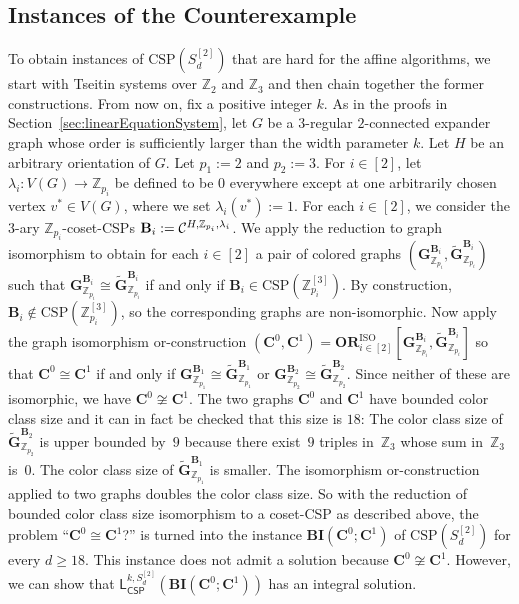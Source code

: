 \documentclass[a4paper,english, thm-restate]{lipics-v2021}
\newcommand{\ZZ}{\mathbb{Z}}
\newcommand{\CFIsym}{\mathbf{G}}
\newcommand{\CFIA}[2]{\CFIsym_{#1}^{#2}}
\newcommand{\CFIB}[2]{\widetilde{\CFIsym}_{#1}^{#2}}
\newcommand{\StructB}{\mathbf{B}}
\newcommand{\StructC}{\mathbf{C}}
\newcommand{\CSP}[1]{\mathrm{CSP}(#1)}
\newcommand{\leqs}{\mathsf{L}}
\newcommand{\cspiso}[3]{\leqs^{#1,#2}_{\mathsf{CSP}}(#3)}
\newcommand{\bbZ}{\mathbb{Z}}
\newcommand{\bcisosys}[2]{\mathbf{BI}(#1;#2)}
\newcommand{\CosetGrpTmplt}[2]{#1^{[#2]}}
\newcommand{\Sym}[1]{S_{#1}}
\newcommand{\ORISO}[2]{\mathbf{OR}^{\text{ISO}}_{#1}[#2]}
\begin{document}
	
	\subsection{Instances of the Counterexample}
	\label{sec:group-csp-counterexamle-instances}
	
	To obtain instances of $\CSP{\CosetGrpTmplt{\Sym{d}}{2}}$
	that are hard for the affine algorithms,
	we start with Tseitin systems over $\ZZ_2$ and $\ZZ_3$
	and then chain together the former constructions.
	From now on, fix a positive integer $k$.
	As in the proofs in Section~\ref{sec:linearEquationSystem},
	let $G$ be a $3$\nobreakdash-regular $2$\nobreakdash-connected expander graph whose order is sufficiently larger than the width parameter $k$.
	Let $H$ be an arbitrary orientation of $G$.
	Let $p_1 := 2$ and $p_2 := 3$. For $i \in [2]$,
	let $\lambda_i \colon V(G) \to \ZZ_{p_i}$ be defined to be $0$ everywhere except at one arbitrarily chosen vertex $v^* \in V(G)$, where we set $\lambda_i(v^*) := 1$.
	For each $i \in [2]$, we consider the $3$-ary $\ZZ_{p_i}$-coset-CSPs $\StructB_i := \grpCSP{H}{\ZZ_{p_i}}{\lambda_i}$. 
	We apply the reduction to graph isomorphism to obtain for each $i \in [2]$ a pair of colored graphs
	$(\CFIA{\bbZ_{p_i}}{\StructB_i}, \CFIB{\bbZ_{p_i}}{\StructB_i})$ such that $\CFIA{\bbZ_{p_i}}{\StructB_i} \cong \CFIB{\bbZ_{p_i}}{\StructB_i}$ if and only if $\StructB_i \in \CSP{\CosetGrpTmplt{\ZZ_{p_i}}{3}}$.
	By construction, $\StructB_i \notin \CSP{\CosetGrpTmplt{\ZZ_{p_i}}{3}}$, so the corresponding graphs are non-isomorphic. 
	Now apply the graph isomorphism or-construction $(\StructC^0, \StructC^1) =
	\ORISO{i \in [2]}{\CFIA{\bbZ_{p_i}}{\StructB_i},\CFIB{\bbZ_{p_i}}{\StructB_i}}$
	so that $\StructC^0 \cong \StructC^1$ if and only if $\CFIA{\bbZ_{p_1}}{\StructB_1} \cong \CFIB{\bbZ_{p_1}}{\StructB_1}$ or $\CFIA{\bbZ_{p_2}}{\StructB_2} \cong \CFIB{\bbZ_{p_2}}{\StructB_2}$. Since neither of these are isomorphic, we have $\StructC^0 \not\cong \StructC^1$. 
	The two graphs $\StructC^0$ and $\StructC^1$ have bounded color class size and it can in fact be checked that this size is $18$:
	The color class size of $\CFIB{\bbZ_{p_2}}{\StructB_2}$ is upper bounded by~$9$ because there exist~$9$ triples in~$\bbZ_{3}$ whose sum in~$\bbZ_3$ is~$0$. The color class size of $\CFIB{\bbZ_{p_1}}{\StructB_1}$ is smaller. The isomorphism or-construction applied to two graphs doubles the color class size.  
	So with the reduction of bounded color class size isomorphism to a coset-CSP as described above,
	the problem ``$\StructC^0 \cong \StructC^1$?'' is turned into the instance $\bcisosys{\StructC^0}{\StructC^1}$ of $\CSP{\CosetGrpTmplt{\Sym{d}}{2}}$ for every $d \geq 18$. This instance does not admit a solution because $\StructC^0 \not\cong \StructC^1$.
	However, we can show that $\cspiso{k}{\CosetGrpTmplt{\Sym{d}}{2}}{\bcisosys{\StructC^0}{\StructC^1}}$ has an integral solution.
	
\end{document}
